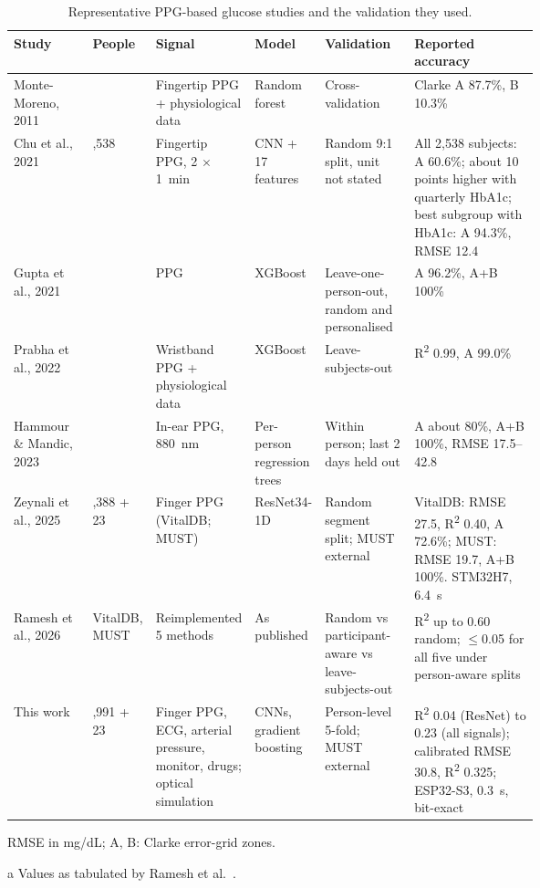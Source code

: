 \documentclass[11pt]{article}
\newcommand{\RR}{R\textsuperscript{2}}
\newcommand{\mgdl}{mg/dL}
\begin{document}
\begin{table}[!htbp]
\centering\footnotesize\setlength{\tabcolsep}{3.5pt}
\begin{threeparttable}
\caption{Representative PPG-based glucose studies and the validation they used.}
\label{tab:related}
\begin{tabularx}{\linewidth}{@{}>{\RaggedRight}p{0.15\linewidth}>{\RaggedRight}p{0.10\linewidth}>{\RaggedRight}p{0.15\linewidth}>{\RaggedRight}p{0.10\linewidth}>{\RaggedRight}p{0.17\linewidth}>{\RaggedRight}X@{}}
\toprule
Study & People & Signal & Model & Validation & Reported accuracy \\
\midrule
Monte-Moreno, 2011~\citep{montemoreno2011} & 410 & Fingertip PPG + physiological data & Random forest & Cross-validation & Clarke A 87.7\%, B 10.3\% \\
Chu et al., 2021~\citep{chu2021} & 2,538 & Fingertip PPG, 2 $\times$ 1~min & CNN + 17 features & Random 9:1 split, unit not stated & All 2,538 subjects: A 60.6\%; about 10 points higher with quarterly HbA1c; best subgroup with HbA1c: A 94.3\%, RMSE 12.4 \\
Gupta et al., 2021~\citep{gupta2021} & 26 & PPG & XGBoost & Leave-one-person-out, random and personalised\tnote{a} & A 96.2\%, A+B 100\%\tnote{a} \\
Prabha et al., 2022~\citep{prabha2022} & 217 & Wristband PPG + physiological data & XGBoost & Leave-subjects-out\tnote{a} & \RR{} 0.99, A 99.0\%\tnote{a} \\
Hammour \& Mandic, 2023~\citep{hammour2023} & 4 & In-ear PPG, 880~nm & Per-person regression trees & Within person; last 2 days held out & A about 80\%, A+B 100\%, RMSE 17.5--42.8 \\
Zeynali et al., 2025~\citep{zeynali2025} & 6,388 + 23 & Finger PPG (VitalDB; MUST) & ResNet34-1D & Random segment split; MUST external & VitalDB: RMSE 27.5, \RR{} 0.40, A 72.6\%; MUST: RMSE 19.7, A+B 100\%. STM32H7, 6.4~s \\
Ramesh et al., 2026~\citep{ramesh2026} & VitalDB, MUST & Reimplemented 5 methods & As published & Random vs participant-aware vs leave-subjects-out & \RR{} up to 0.60 random; $\leq$0.05 for all five under person-aware splits \\
\rowcolor{rowgray} This work & 2,991 + 23 & Finger PPG, ECG, arterial pressure, monitor, drugs; optical simulation & CNNs, gradient boosting & Person-level 5-fold; MUST external & \RR{} 0.04 (ResNet) to 0.23 (all signals); calibrated RMSE 30.8, \RR{} 0.325; ESP32-S3, 0.3~s, bit-exact \\
\bottomrule
\end{tabularx}
\begin{tablenotes}\footnotesize
\item RMSE in \mgdl{}; A, B: Clarke error-grid zones. \item[a] Values as tabulated by Ramesh et al.~\citep{ramesh2026}.
\end{tablenotes}
\end{threeparttable}
\end{table}
\end{document}
